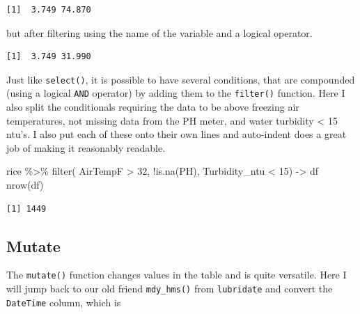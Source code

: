 \documentclass[
  letterpaper,
]{book}
\newenvironment{Shaded}{\begin{snugshade}}{\end{snugshade}}
\newcommand{\DecValTok}[1]{\textcolor[rgb]{0.68,0.00,0.00}{#1}}
\newcommand{\FunctionTok}[1]{\textcolor[rgb]{0.28,0.35,0.67}{#1}}
\newcommand{\NormalTok}[1]{\textcolor[rgb]{0.00,0.23,0.31}{#1}}
\newcommand{\OtherTok}[1]{\textcolor[rgb]{0.00,0.23,0.31}{#1}}
\newcommand{\SpecialCharTok}[1]{\textcolor[rgb]{0.37,0.37,0.37}{#1}}
\begin{document}
\begin{verbatim}
[1]  3.749 74.870
\end{verbatim}

but after filtering using the name of the variable and a logical
operator.

\begin{Shaded}
\end{Shaded}

\begin{verbatim}
[1]  3.749 31.990
\end{verbatim}

Just like \texttt{select()}, it is possible to have several conditions,
that are compounded (using a logical \texttt{AND} operator) by adding
them to the \texttt{filter()} function. Here I also split the
conditionals requiring the data to be above freezing air temperatures,
not missing data from the PH meter, and water turbidity \textless{} 15
ntu's. I also put each of these onto their own lines and auto-indent
does a great job of making it reasonably readable.

\begin{Shaded}
\begin{Highlighting}[]
\NormalTok{rice }\SpecialCharTok{\%\textgreater{}\%}
  \FunctionTok{filter}\NormalTok{( AirTempF }\SpecialCharTok{\textgreater{}} \DecValTok{32}\NormalTok{, }
          \SpecialCharTok{!}\FunctionTok{is.na}\NormalTok{(PH), }
\NormalTok{          Turbidity\_ntu }\SpecialCharTok{\textless{}} \DecValTok{15}\NormalTok{) }\OtherTok{{-}\textgreater{}}\NormalTok{ df}
\FunctionTok{nrow}\NormalTok{(df)}
\end{Highlighting}
\end{Shaded}

\begin{verbatim}
[1] 1449
\end{verbatim}

\subsection{Mutate}\label{mutate}

The \texttt{mutate()} function changes values in the table and is quite
versatile. Here I will jump back to our old friend \texttt{mdy\_hms()}
from \texttt{lubridate} and convert the \texttt{DateTime} column, which
is
\end{document}

